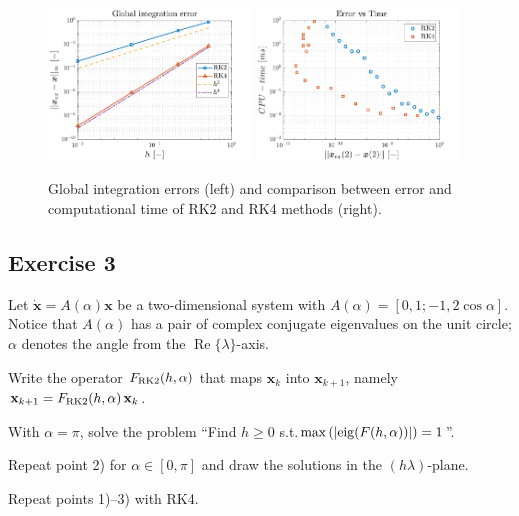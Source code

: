 \documentclass[11pt,a4paper,oneside]{article}
\renewcommand{\vec}[1]{\mathbf{#1}}
\begin{document}
\begin{figure}[h]
    \centering
    \includegraphics[width = 0.48\textwidth]{gfx/ex2_5.pdf}
    \includegraphics[width = 0.48\textwidth]{gfx/ex2_6.pdf}
    \caption{Global integration errors (left) and comparison between error and computational time of RK2 and RK4 methods (right).}
    \label{fig:ex2_globErr}
\end{figure}



\subsection*{Exercise 3}

Let $\dot{\vec x} = A(\alpha) \vec x$ be a two-dimensional system with $A(\alpha) = [0, 1; -1, 2\cos\alpha]$. Notice that $A(\alpha)$ has a pair of complex conjugate eigenvalues on the unit circle; $\alpha$ denotes the angle from the $\operatorname{Re}\{\lambda\}$-axis. 
\begin{enumerate*}[label=\arabic*)]
    \item Write the operator $F_{\rm RK2}(h,\alpha)$ that maps $\vec x_k$ into $\vec x_{k+1}$, namely $\vec x_{k+1} = F_{\rm RK2}(h,\alpha) \, \vec x_k$.
    \item\!With $\alpha = \pi$, solve the problem ``Find $h\ge 0$ s.t.$\max\left(|{\rm eig}(F(h,\alpha))|\right) = 1$''.
    \item Repeat point 2) for $\alpha\in[0, \pi]$ and draw the solutions in the $(h\lambda)$-plane.
    \item Repeat points 1)--3) with RK4.
\end{enumerate*}
\end{document}
